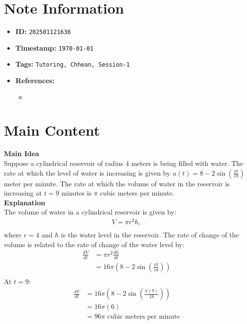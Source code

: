 \clearpage
{}
\label{202501121636}
\renewcommand{\notetitle}{Question-4}

\section*{Note Information}
\begin{itemize}
  \item \textbf{ID:} \texttt{202501121636}
  \item \textbf{Timestamp:} \texttt{\today \ \currenttime}
  \item \textbf{Tags:} \texttt{Tutoring, Chhean, Session-1}
  \item \textbf{References:}
    \begin{itemize}
      \item \href{}{}
    \end{itemize}
\end{itemize}


\section*{Main Content}
\textbf{Main Idea}\\
Suppose a cylindrical reservoir of radius 4 meters is being filled with water. The rate at which the level of water is increasing is given by $u(t) = 8 - 2 \sin (\frac{\pi t}{18})$ meter per minute.
The rate at which the volume of water in the reservoir is increasing at $t = 9$ minutes is $ \pi$ cubic meters per minute.\\

\textbf{Explanation}\\
The volume of water in a cylindrical reservoir is given by:
\begin{align*}
  V = \pi r^2 h,\\
\end{align*}
where $r = 4$ and $h$ is the water level in the reservoir. 
The rate of change of the volume is related to the rate of change of the water level by:
\begin{align*}
  \frac{dV}{dt} &= \pi r^2 \frac{dh}{dt}\\
  &= 16 \pi (8 - 2 \sin(\frac{\pi t}{18}))\\
\end{align*}
At $t = 9$:
\begin{align*}
  \frac{dV}{dt} &= 16 \pi (8 - 2 \sin (\frac{\pi (9)}{18}))\\
                &= 16 \pi (6)\\
                &= 96 \pi \text{ cubic meters per minute}
\end{align*}

